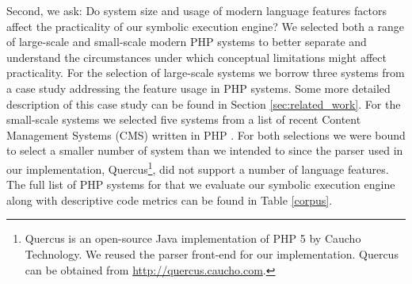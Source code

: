 \documentclass[sigconf]{acmart}
\renewcommand{\sf}[1]{\textsf{#1}}
\begin{document}
Second, we ask: Do system size and usage of modern language features
factors affect the practicality of our symbolic execution engine? We
selected both a range of large-scale and small-scale modern PHP systems to
better separate and understand the circumstances under which conceptual
limitations might affect practicality. For the selection of large-scale systems
we borrow three systems from a case study addressing the feature usage in PHP
systems. Some more detailed description of this case study can be found in
Section \ref{sec:related_work}. For the small-scale systems we selected five systems from
a list of recent Content Management Systems (CMS) written in PHP \cite{codegeekz}. For both
selections we were bound to select a smaller number of system than we intended
to since the parser used in our implementation,
\sf{Quercus}\footnote{\sf{Quercus} is an open-source Java implementation of PHP
5 by Caucho Technology. We reused the parser front-end for our implementation.
\sf{Quercus} can be obtained from \url{http://quercus.caucho.com}.}, did not
support a number of language features.
The full list of PHP systems for that we evaluate our symbolic execution engine along with descriptive code metrics can be found in Table \ref{corpus}.


\end{document}
